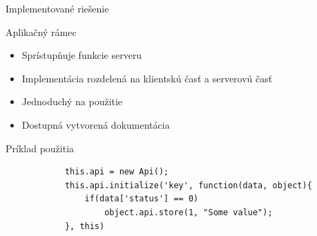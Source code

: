 \documentclass[10pt]{beamer}
\begin{document}
\begin{frame}[fragile]{Implementované riešenie}
    \begin{block}{Aplikačný rámec}
		\begin{itemize}
		\item Sprístupňuje funkcie serveru
        \item Implementácia rozdelená na klientskú časť a serverovú časť
        \item Jednoduchý na použitie 
        \item Dostupná vytvorená dokumentácia
    \end{itemize}
	\end{block}
	\begin{exampleblock}{Príklad použitia}
		\begin{verbatim}
		    this.api = new Api();
		    this.api.initialize('key', function(data, object){
		        if(data['status'] == 0)
		            object.api.store(1, "Some value");
		    }, this)
		\end{verbatim}
	\end{exampleblock}
\end{frame}
\end{document}
